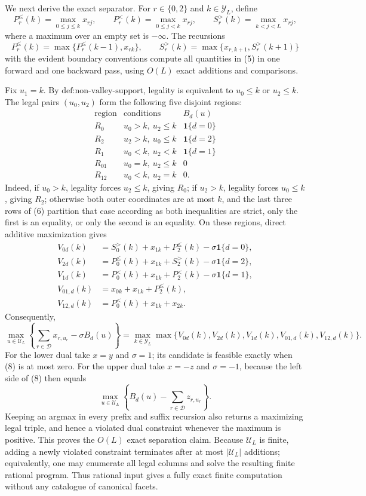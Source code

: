 We next derive the exact separator.  For \(r\in\{0,2\}\) and \(k\in\mathcal Y_L\), define
\[
 P_r^{\le}(k)=\max_{0\le j\le k}x_{rj},\qquad
 P_r^{<}(k)=\max_{0\le j<k}x_{rj},\qquad
 S_r^{>}(k)=\max_{k<j<L}x_{rj},
 \tag{5}
\]
where a maximum over an empty set is \(-\infty\).  The recursions
\[
 P_r^{\le}(k)=\max\{P_r^{\le}(k-1),x_{rk}\},
 \qquad
 S_r^{>}(k)=\max\{x_{r,k+1},S_r^{>}(k+1)\}
\]
with the evident boundary conventions compute all quantities in (5) in one forward and one backward pass, using \(O(L)\) exact additions and comparisons.

Fix \(u_1=k\).  By \(\text{def:non-valley-support}\), legality is equivalent to \(u_0\le k\) or \(u_2\le k\).  The legal pairs \((u_0,u_2)\) form the following five disjoint regions:
\[
\begin{array}{c|c|c}
\text{region}&\text{conditions}&B_d(u)\\ \hline
R_0&u_0>k,\ u_2\le k&\mathbf 1\{d=0\}\\
R_2&u_2>k,\ u_0\le k&\mathbf 1\{d=2\}\\
R_1&u_0<k,\ u_2<k&\mathbf 1\{d=1\}\\
R_{01}&u_0=k,\ u_2\le k&0\\
R_{12}&u_0<k,\ u_2=k&0.
\end{array}
 \tag{6}
\]
Indeed, if \(u_0>k\), legality forces \(u_2\le k\), giving \(R_0\); if \(u_2>k\), legality forces \(u_0\le k\), giving \(R_2\); otherwise both outer coordinates are at most \(k\), and the last three rows of (6) partition that case according as both inequalities are strict, only the first is an equality, or only the second is an equality.  On these regions, direct additive maximization gives
\[
\begin{aligned}
 V_{0d}(k)&=S_0^{>}(k)+x_{1k}+P_2^{\le}(k)-\sigma\mathbf 1\{d=0\},\\
 V_{2d}(k)&=P_0^{\le}(k)+x_{1k}+S_2^{>}(k)-\sigma\mathbf 1\{d=2\},\\
 V_{1d}(k)&=P_0^{<}(k)+x_{1k}+P_2^{<}(k)-\sigma\mathbf 1\{d=1\},\\
 V_{01,d}(k)&=x_{0k}+x_{1k}+P_2^{\le}(k),\\
 V_{12,d}(k)&=P_0^{<}(k)+x_{1k}+x_{2k}.
\end{aligned}
 \tag{7}
\]
Consequently,
\[
 \max_{u\in\mathcal U_L}
 \left\{\sum_{r\in\mathcal D}x_{r,u_r}-\sigma B_d(u)\right\}
 =\max_{k\in\mathcal Y_L}
 \max\{V_{0d}(k),V_{2d}(k),V_{1d}(k),V_{01,d}(k),V_{12,d}(k)\}.
 \tag{8}
\]
For the lower dual take \(x=y\) and \(\sigma=1\); its candidate is feasible exactly when (8) is at most zero.  For the upper dual take \(x=-z\) and \(\sigma=-1\), because the left side of (8) then equals
\[
 \max_{u\in\mathcal U_L}\left\{B_d(u)-\sum_{r\in\mathcal D}z_{r,u_r}\right\}.
\]
Keeping an argmax in every prefix and suffix recursion also returns a maximizing legal triple, and hence a violated dual constraint whenever the maximum is positive.  This proves the \(O(L)\) exact separation claim.  Because \(\mathcal U_L\) is finite, adding a newly violated constraint terminates after at most \(|\mathcal U_L|\) additions; equivalently, one may enumerate all legal columns and solve the resulting finite rational program.  Thus rational input gives a fully exact finite computation without any catalogue of canonical facets.

